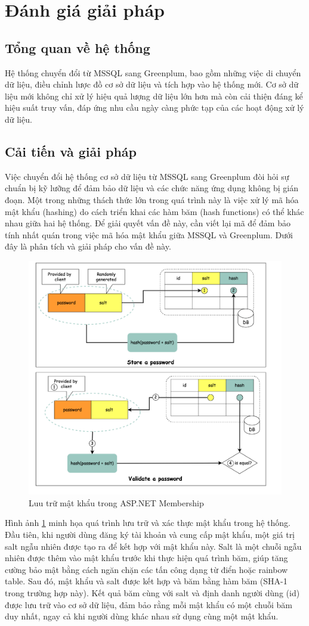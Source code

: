 \documentclass[14pt]{article}
\begin{document}
\section{Đánh giá giải pháp}


\subsection{Tổng quan về hệ thống} 

Hệ thống chuyển đổi từ MSSQL sang Greenplum, bao gồm những việc di chuyển dữ liệu, điều chỉnh lược đồ cơ sở dữ liệu và tích hợp vào hệ thống mới. Cơ sở dữ liệu mới không chỉ xử lý hiệu quả lượng dữ liệu lớn hơn mà còn cải thiện đáng kể hiệu suất truy vấn, đáp ứng nhu cầu ngày càng phức tạp của các hoạt động xử lý dữ liệu.


\subsection{Cải tiến và giải pháp}

Việc chuyển đổi hệ thống cơ sở dữ liệu từ MSSQL sang Greenplum đòi hỏi sự chuẩn bị kỹ lưỡng để đảm bảo dữ liệu và các chức năng ứng dụng không bị gián đoạn. Một trong những thách thức lớn trong quá trình này là việc xử lý mã hóa mật khẩu (hashing) do cách triển khai các hàm băm (hash functions) có thể khác nhau giữa hai hệ thống. Để giải quyết vấn đề này, cần viết lại mã để đảm bảo tính nhất quán trong việc mã hóa mật khẩu giữa MSSQL và Greenplum. Dưới đây là phân tích và giải pháp cho vấn đề này.

\begin{figure}
    \centering
    \includegraphics[width=0.5\linewidth]{images/StorePassword.png}
    \caption{Luu trữ mật khẩu trong ASP.NET Membership}
    \label{fig:StorePassword}
\end{figure}

Hình ảnh \ref{fig:StorePassword} minh họa quá trình lưu trữ và xác thực mật khẩu trong hệ thống. Đầu tiên, khi người dùng đăng ký tài khoản và cung cấp mật khẩu, một giá trị salt ngẫu nhiên được tạo ra để kết hợp với mật khẩu này. Salt là một chuỗi ngẫu nhiên được thêm vào mật khẩu trước khi thực hiện quá trình băm, giúp tăng cường bảo mật bằng cách ngăn chặn các tấn công dạng từ điển hoặc rainbow table. Sau đó, mật khẩu và salt được kết hợp và băm bằng hàm băm (SHA-1 trong trường hợp này). Kết quả băm cùng với salt và định danh người dùng (id) được lưu trữ vào cơ sở dữ liệu, đảm bảo rằng mỗi mật khẩu có một chuỗi băm duy nhất, ngay cả khi người dùng khác nhau sử dụng cùng một mật khẩu.
\end{document}
